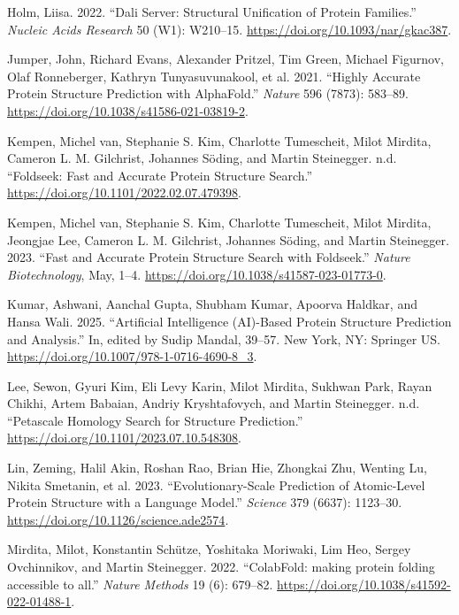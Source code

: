 \documentclass[
]{scrbook}
\newlength{\cslhangindent}
\newenvironment{CSLReferences}[2] %
 {\begin{list}{}{%
  \setlength{\itemindent}{0pt}
  \setlength{\leftmargin}{0pt}
  \setlength{\parsep}{0pt}
  \ifodd #1
   \setlength{\leftmargin}{\cslhangindent}
   \setlength{\itemindent}{-1\cslhangindent}
  \fi
  \setlength{\itemsep}{#2\baselineskip}}}
 {\end{list}}
\begin{document}
\begin{CSLReferences}{1}{0}
Holm, Liisa. 2022. {``Dali Server: Structural Unification of Protein
Families.''} \emph{Nucleic Acids Research} 50 (W1): W210--15.
\url{https://doi.org/10.1093/nar/gkac387}.

Jumper, John, Richard Evans, Alexander Pritzel, Tim Green, Michael
Figurnov, Olaf Ronneberger, Kathryn Tunyasuvunakool, et al. 2021.
{``Highly Accurate Protein Structure Prediction with AlphaFold.''}
\emph{Nature} 596 (7873): 583--89.
\url{https://doi.org/10.1038/s41586-021-03819-2}.

Kempen, Michel van, Stephanie S. Kim, Charlotte Tumescheit, Milot
Mirdita, Cameron L. M. Gilchrist, Johannes Söding, and Martin
Steinegger. n.d. {``Foldseek: Fast and Accurate Protein Structure
Search.''} \url{https://doi.org/10.1101/2022.02.07.479398}.

Kempen, Michel van, Stephanie S. Kim, Charlotte Tumescheit, Milot
Mirdita, Jeongjae Lee, Cameron L. M. Gilchrist, Johannes Söding, and
Martin Steinegger. 2023. {``Fast and Accurate Protein Structure Search
with Foldseek.''} \emph{Nature Biotechnology}, May, 1--4.
\url{https://doi.org/10.1038/s41587-023-01773-0}.

Kumar, Ashwani, Aanchal Gupta, Shubham Kumar, Apoorva Haldkar, and Hansa
Wali. 2025. {``Artificial Intelligence (AI)-Based Protein Structure
Prediction and Analysis.''} In, edited by Sudip Mandal, 39--57. New
York, NY: Springer US.
\url{https://doi.org/10.1007/978-1-0716-4690-8_3}.

Lee, Sewon, Gyuri Kim, Eli Levy Karin, Milot Mirdita, Sukhwan Park,
Rayan Chikhi, Artem Babaian, Andriy Kryshtafovych, and Martin
Steinegger. n.d. {``Petascale Homology Search for Structure
Prediction.''} \url{https://doi.org/10.1101/2023.07.10.548308}.

Lin, Zeming, Halil Akin, Roshan Rao, Brian Hie, Zhongkai Zhu, Wenting
Lu, Nikita Smetanin, et al. 2023. {``Evolutionary-Scale Prediction of
Atomic-Level Protein Structure with a Language Model.''} \emph{Science}
379 (6637): 1123--30. \url{https://doi.org/10.1126/science.ade2574}.

Mirdita, Milot, Konstantin Schütze, Yoshitaka Moriwaki, Lim Heo, Sergey
Ovchinnikov, and Martin Steinegger. 2022. {``ColabFold: making protein
folding accessible to all.''} \emph{Nature Methods} 19 (6): 679--82.
\url{https://doi.org/10.1038/s41592-022-01488-1}.


\end{CSLReferences}
\end{document}
